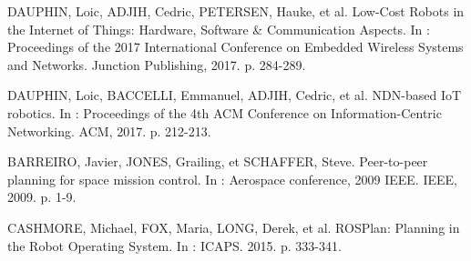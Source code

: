 
DAUPHIN, Loic, ADJIH, Cedric, PETERSEN, Hauke, et al. 
Low-Cost Robots in the Internet of Things: Hardware, Software \& Communication Aspects. 
In : Proceedings of the 2017 International Conference on Embedded Wireless Systems and Networks. Junction Publishing, 2017. p. 284-289.

DAUPHIN, Loic, BACCELLI, Emmanuel, ADJIH, Cedric, et al. 
NDN-based IoT robotics. 
In : Proceedings of the 4th ACM Conference on Information-Centric Networking. ACM, 2017. p. 212-213.

BARREIRO, Javier, JONES, Grailing, et SCHAFFER, Steve. 
Peer-to-peer planning for space mission control. 
In : Aerospace conference, 2009 IEEE. IEEE, 2009. p. 1-9.

CASHMORE, Michael, FOX, Maria, LONG, Derek, et al. 
ROSPlan: Planning in the Robot Operating System. 
In : ICAPS. 2015. p. 333-341.
